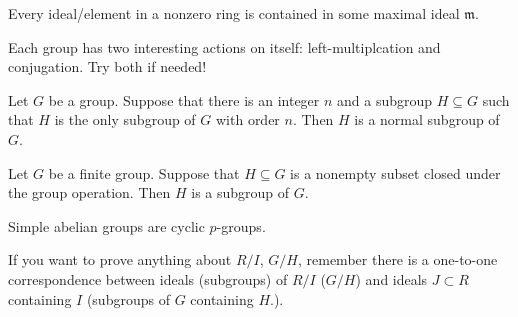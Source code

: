 \documentclass[openany]{book}
\begin{document}
\begin{prop}
    Every ideal/element in a nonzero ring is contained in some maximal ideal $\mathfrak{m}$.
\end{prop}

\begin{prop}
    Each group has two interesting actions on itself: left-multiplcation and conjugation. Try both if needed!
\end{prop}

\begin{prop}
    Let $G$ be a group. Suppose that there is an integer $n$ and a subgroup $H\subseteq G$ such that $H$ is the only subgroup of $G$ with order $n$. Then $H$ is a normal subgroup of $G$.
\end{prop}

\begin{prop}
    Let $G$ be a finite group. Suppose that $H\subseteq G$ is a nonempty subset closed under the group operation. Then $H$ is a subgroup of $G$.
\end{prop}


\begin{prop}
    Simple abelian groups are cyclic $p$-groups.
\end{prop}

\begin{prop}
    If you want to prove anything about $R/I$, $G/H$, remember there is a one-to-one correspondence between ideals (subgroups) of $R/I$ ($G/H$) and ideals $J\subset R$ containing $I$ (subgroups of $G$ containing $H$.).
\end{prop}
\end{document}
